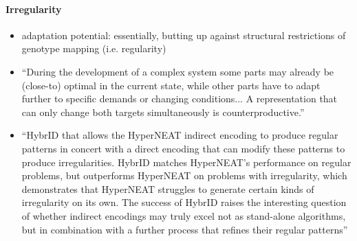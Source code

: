 \paragraph{Irregularity}
  \begin{itemize}
    \item adaptation potential: essentially, butting up against structural restrictions of genotype mapping (i.e. regularity)
    \item ``During the development of a complex system some parts may already be (close-to) optimal in the current state, while other parts have to adapt further to specific demands or changing conditions... A representation that can only change both targets simultaneously is counterproductive.'' \cite{Richter2015EvolvabilitySurvey}
    \item ``HybrID that allows the HyperNEAT indirect encoding to produce regular patterns in concert with a direct encoding that can modify these patterns to produce irregularities. HybrID matches HyperNEAT’s performance on regular problems, but outperforms HyperNEAT on problems with irregularity, which demonstrates that HyperNEAT struggles to generate certain kinds of irregularity on its own. The success of HybrID raises the interesting question of whether indirect encodings may truly excel not as stand-alone algorithms, but in combination with a further process that refines their regular patterns'' \cite{Clune2011OnRegularity}
  \end{itemize}
  
  

